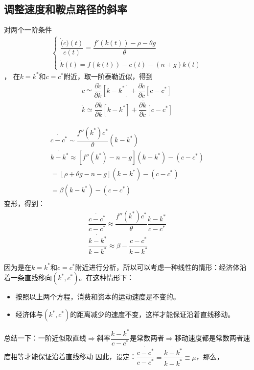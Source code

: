 \subsection{调整速度和鞍点路径的斜率} 
对两个一阶条件
\begin{gather}
\begin{cases}
\dfrac{\dot(c)(t)}{c(t)}=\dfrac{f'(k(t))-\rho-\theta g}
{\theta}\\
\dot{k}(t)=f(k(t))-c(t)-(n+g)k(t)
\end{cases}
\end{gather}
，
在$ k=k^*$和$c=c^* $附近，取一阶泰勒近似，得到
\begin{gather}
	\dot{c}\simeq \dfrac{\partial \dot{c}}{\partial k}
	[k-k^*]+\dfrac{\partial \dot{c}}{\partial c}[c-c^*]
	\\
	\dot{k}\simeq \dfrac{\partial \dot{k}}{\partial k}
	[k-k^*]+\dfrac{\partial \dot{k}}{\partial c}[c-c^*]
\end{gather}

\begin{eqnarray}
	\dot{c-c^*}\sim \dfrac{f''(k^*)c^*}{\theta}(k-k^*)
	\\
	\dot{k-k^*}\approx [f''(k^*)-n-g](k-k^*)-(c-c^*)
	\\
	=[\rho+\theta g-n-g](k-k^*)-(c-c^*)
	\\
	=\beta(k-k^*)-(c-c^*)
\end{eqnarray}
变形，得到：
\begin{align}
\dfrac{\dot{c-c^*}}{c-c^*}\approx \dfrac{f''(k^*)c^*}{\theta}	\dfrac{k-k^*}{c-c^*}
\\
\dfrac{\dot{k-k^*}}{k-k^*}\approx\beta -\dfrac{c-c^*}{k-k^*}
\end{align}

因为是在$ k=k^* $和$ c=c^* $附近进行分析，所以可以考虑一种线性的情形：经济体沿着一条直线移向$ (k^*,c^*) $。在这种情形下：

\begin{itemize}
	\item 按照以上两个方程，消费和资本的运动速度是不变的。
	
	\item 经济体与$ (k^*,c^*) $的距离减少的速度不变，这样才能保证沿着直线移动。
	
\end{itemize}

总结一下：一阶近似取直线$ \Rightarrow $斜率$ \dfrac{k-k^*}{c-c^*} $是常数两者$ \Rightarrow $移动速度都是常数两者速度相等才能保证沿着直线移动
因此，设定：$ \dfrac{\dot{c-c^*}}{c-c^*}=\dfrac{\dot{k-k^*}}{k-k^*}\equiv  \mu$，那么，

